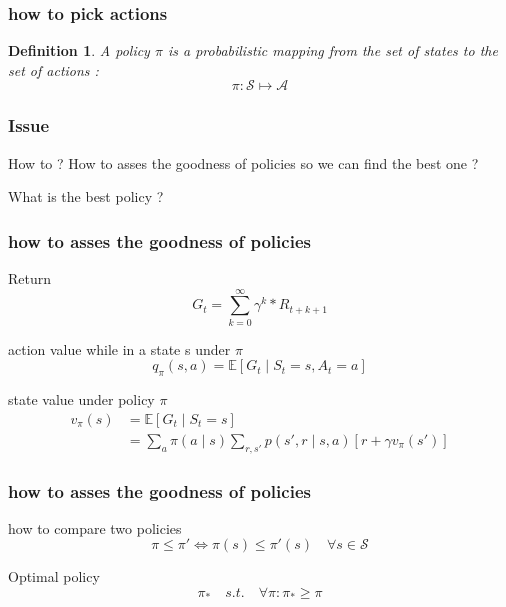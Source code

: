 \documentclass[dvipsnames,svgnames]{beamer}
\newtheorem{madef}{Definition}
\begin{document}
\begin{frame}
\frametitle{how to pick actions}
\begin{madef}
A \emph{policy} $\pi$ is a probabilistic mapping from the set of states to the set of actions : 
$$ \pi : \mathcal{S} \mapsto \mathcal{A} $$

\end{madef}
\end{frame}

\begin{frame}
\frametitle{Issue}
\begin{alertblock}{How to ?}
How to asses the goodness of policies so we can find the best one ? 

What is the best policy ?
\end{alertblock}
\end{frame}

\begin{frame}
\frametitle{how to asses the goodness of policies}
\begin{block}{Return}
$$ G_t= \sum_{k=0}^{\infty}\gamma^k * R_{t+k+1}$$
\end{block}

\pause
\begin{block}{action value while in a state s under $\pi$}
\begin{equation}
q_{\pi}(s,a) = \mathbb{E}[G_t\mid S_t =s,A_t=a]
\end{equation}
\end{block}

\pause
\begin{block}{state value under policy $\pi$}
\begin{equation}
\begin{split}
v_{\pi}(s)&=\mathbb{E}[G_t \mid S_t=s] 
\\& = \sum_{a}\pi(a\mid s)\sum_{r,s'}p(s',r\mid s,a)[r+\gamma v_{\pi}(s')]
\end{split}
\end{equation}
\end{block}



\end{frame}

\begin{frame}
\frametitle{how to asses the goodness of policies}
\begin{block}{how to compare two policies}
$$ \pi \leq \pi ' \iff  \pi (s)\leq \pi ' (s) \quad \forall s \in \mathcal{S}
$$
\end{block}

\pause 

\begin{block}{Optimal policy}
$$ \pi_{*} \quad s.t. \quad \forall \pi : \pi_{*}\geq \pi $$
\end{block}
\end{frame}
\end{document}
